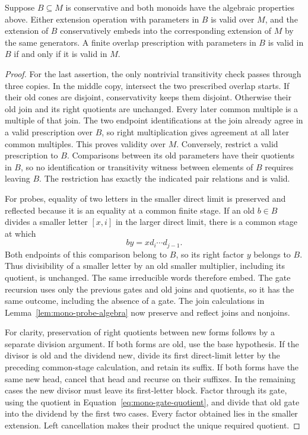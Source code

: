 \begin{lemma}\label{lem:mono-simulation}
Suppose $B\subseteq M$ is conservative and both monoids have the
algebraic properties above.  Either extension operation with parameters
in $B$ is valid over $M$, and the extension of $B$ conservatively
embeds into the corresponding extension of $M$ by the same generators.
A finite overlap prescription with parameters in $B$ is valid in $B$
if and only if it is valid in $M$.
\end{lemma}
\begin{proof}
For the last assertion, the only nontrivial transitivity check passes
through three copies.  In the middle copy, intersect the two prescribed
overlap starts.  If their old cones are disjoint, conservativity keeps
them disjoint.  Otherwise their old join and its right quotients are
unchanged.  Every later common multiple is a multiple of that join.
The two endpoint identifications at the join already agree in a valid
prescription over $B$, so right multiplication gives agreement at all
later common multiples.  This proves validity over $M$.  Conversely,
restrict a valid prescription to $B$.  Comparisons between its old
parameters have their quotients in $B$, so no identification or
transitivity witness between elements of $B$ requires leaving $B$.
The restriction has exactly the indicated pair relations and is valid.

For probes, equality of two letters in the smaller direct limit is
preserved and reflected because it is an equality at a common finite
stage.  If an old $b\in B$ divides a smaller letter $[x,i]$ in the
larger direct limit, there is a common stage at which
\[
 by=x d_i\cdots d_{j-1}.
\]
Both endpoints of this comparison belong to $B$, so its right factor
$y$ belongs to $B$.  Thus divisibility of a smaller letter by an old
smaller multiplier, including its quotient, is unchanged.  The same
irreducible words therefore embed.  The gate recursion uses only the
previous gates and old joins and quotients, so it has the same outcome,
including the absence of a gate.  The join calculations in
Lemma~\ref{lem:mono-probe-algebra} now preserve and reflect joins and
nonjoins.

For clarity, preservation of right quotients between new forms follows
by a separate division argument.  If both forms are old, use the base
hypothesis.  If the divisor is old and the dividend new, divide its
first direct-limit letter by the preceding common-stage calculation,
and retain its suffix.  If both forms have the same new head, cancel
that head and recurse on their suffixes.  In the remaining cases the
new divisor must leave its first-letter block.  Factor through its
gate, using the quotient in Equation~\eqref{eq:mono-gate-quotient},
and divide that old gate into the dividend by the first two cases.
Every factor obtained lies in the smaller extension.  Left
cancellation makes their product the unique required quotient.


\end{proof}
